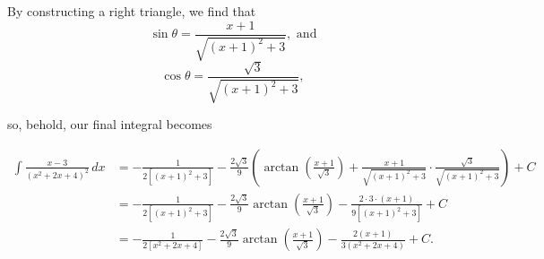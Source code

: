\documentclass[12pt,oneside,english]{amsart}
\begin{document}
\begin{enumerate}[leftmargin=*]
\vspace{0.5cm}
\begin{multicols}{2}By constructing a right triangle, we find that 
\[
\sin\theta=\frac{x+1}{\sqrt{(x+1)^{2}+3}},\text{ and}
\]
\[
\cos\theta=\frac{\sqrt{3}}{\sqrt{(x+1)^{2}+3}},
\]
\columnbreak
\begin{center}
\end{center}
\end{multicols}so, behold, our final integral becomes

\begin{align*}
\int\frac{x-3}{(x^{2}+2x+4)^{2}}\,dx & =-\frac{1}{2\left[(x+1)^{2}+3\right]}-\frac{2\sqrt{3}}{9}\left(\arctan\left(\frac{x+1}{\sqrt{3}}\right)+\frac{x+1}{\sqrt{(x+1)^{2}+3}}\cdot\frac{\sqrt{3}}{\sqrt{(x+1)^{2}+3}}\right)+C\\
 & =-\frac{1}{2\left[(x+1)^{2}+3\right]}-\frac{2\sqrt{3}}{9}\arctan\left(\frac{x+1}{\sqrt{3}}\right)-\frac{2\cdot3\cdot(x+1)}{9\left[(x+1)^{2}+3\right]}+C\\
 & =-\frac{1}{2\left[x^{2}+2x+4\right]}-\frac{2\sqrt{3}}{9}\arctan\left(\frac{x+1}{\sqrt{3}}\right)-\frac{2(x+1)}{3(x^{2}+2x+4)}+C.
\end{align*}





\end{enumerate}
\end{document}
